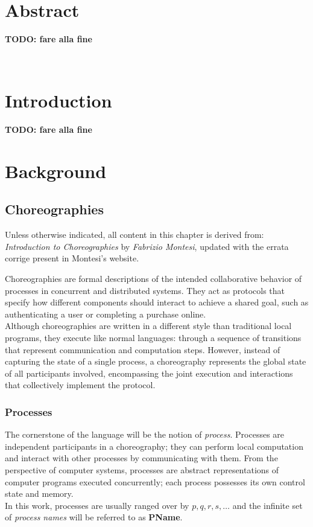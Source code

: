\documentclass[12pt,a4paper,twoside]{book}
\begin{document}
\newpage~\newpage

\chapter*{Abstract}
\textbf{TODO: fare alla fine}
\topmargin=-1cm

\tableofcontents
\thispagestyle{empty}

\newpage~\newpage

\raggedbottom
\chapter{Introduction} \label{chap:intro}
\pagestyle{plain}
\setcounter{page}{1}
\textbf{TODO: fare alla fine}

\chapter{Background} \label{chap:background}
\section{Choreographies}
\label{background:choreographies}
Unless otherwise indicated, all content in this chapter is derived from: \textit{Introduction to Choreographies\cite{montesi2023introduction}} by \textit{Fabrizio Montesi}, updated with the errata corrige present in Montesi's website\cite{montesiChoreographies}.
\vspace{10pt}

Choreographies are formal descriptions of the intended collaborative behavior of processes in concurrent and distributed systems. They act as protocols that specify how different components should interact to achieve a shared goal, such as authenticating a user or completing a purchase online.\\
Although choreographies are written in a different style than traditional local programs, they execute like normal languages: through a sequence of transitions that represent communication and computation steps. However, instead of capturing the state of a single process, a choreography represents the global state of all participants involved, encompassing the joint execution and interactions that collectively implement the protocol.


\subsection{Processes}
The cornerstone of the language will be the notion of \textit{process}. Processes are independent participants in a choreography; they can perform local computation and interact with other processes by communicating with them. From the perspective of computer systems, processes are abstract representations of computer programs executed concurrently; each process possesses its own control state and memory.\\
In this work, processes are usually ranged over by $p, q, r, s, \ldots$ and the infinite set of \textit{process names} will be referred to as \textbf{PName}.
\end{document}
